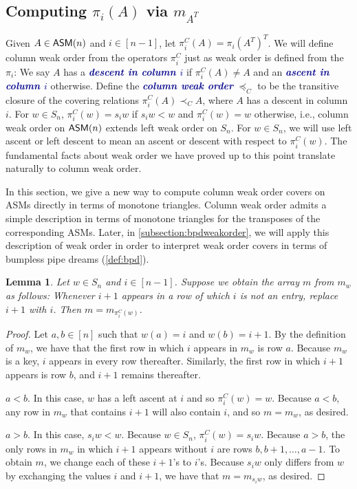 \documentclass[12 pt]{amsart}
\newcommand{\newword}[1]{\textcolor{darkblue}{\textbf{\emph{#1}}}}
\newtheorem{lemma}[Theorem]{Lemma}
\numberwithin{equation}{section}
\theoremstyle{remark}
\newcommand{\asm}{{\sf ASM}}
\begin{document}
\subsection{Computing $\pi_i(A)$ via $m_{A^T}$}
\label{sect:computing-pi_i(A)-with-column-weak-order}

Given $A\in \asm(n)$ and $i \in [n-1]$, let $\pi_i^C(A)=\pi_i(A^T)^T$. We will define column weak order from the operators $\pi^C_i$ just as weak order is defined from the $\pi_i$:  We say $A$ has a \newword{descent in column $i$} if $\pi_i^C(A)\neq A$ and an \newword{ascent in column $i$} otherwise. Define the \newword{column weak order} $\preceq_C$ to be the transitive closure of the covering relations $\pi_i^C(A)\prec_C A$, where $A$ has a descent in column $i$. For $w \in S_n$, $\pi_i^C(w) = s_iw$ if $s_iw<w$ and $\pi_i^C(w) = w$ otherwise, i.e., column weak order on $\asm(n)$ extends left weak order on $S_n$. For $w \in S_n$, we will use left ascent or left descent to mean an ascent or descent with respect to $\pi_i^C(w)$. The fundamental facts about weak order we have proved up to this point translate naturally to column weak order. 

In this section, we give a new way to compute column weak order covers on ASMs directly in terms of monotone triangles.  Column weak order admits a simple description in terms of monotone triangles for the transposes of the corresponding ASMs.  Later, in \cref{subsection:bpdweakorder}, we will apply this description of weak order in order to interpret weak order covers in terms of bumpless pipe dreams (\cref{def:bpd}).


\begin{lemma}
\label{lemma:monotone_transpose_weak_order_permutations}
    Let $w\in S_n$ and $i\in[n-1]$.  Suppose we obtain the array $m$ from $m_w$ as follows: Whenever $i+1$ appears in a row of which $i$ is not an entry, replace $i+1$ with $i$.  Then $m=m_{\pi_i^C(w)}$.
\end{lemma}
\begin{proof}

Let $a,b\in [n]$ such that $w(a)=i$ and $w(b)=i+1$.
By the definition of $m_w$, we have that the first row in which $i$ appears in $m_w$ is row $a$.  Because $m_w$ is a key, $i$ appears in every row thereafter.  Similarly, the first row in which $i+1$ appears is row $b$, and $i+1$ remains thereafter.

 $a<b$. In this case, $w$ has a left ascent at $i$ and so $\pi_i^C(w)=w$.  Because $a<b$, any row in $m_w$ that contains $i+1$ will also contain $i$, and so $m=m_w$, as desired.

 $a>b$.
    In this case, $s_i w<w$.  Because $w\in S_n$, $\pi_i^C(w)=s_i w$.
Because $a>b$, the only rows in $m_w$ in which $i+1$ appears without $i$ are rows $b, b+1,\ldots, a-1$.  To obtain $m$, we change each of these $i+1$'s to $i$'s.  Because $s_i w$ only differs from $w$ by exchanging the values $i$ and $i+1$, we have that $m=m_{s_iw}$, as desired.
\end{proof}
\end{document}
